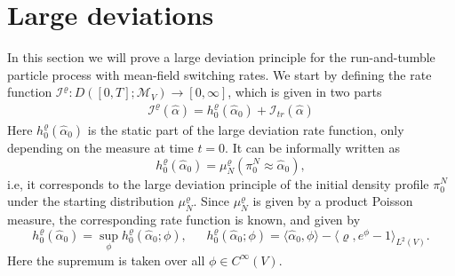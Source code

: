 \documentclass[11pt]{article}
\numberwithin{equation}{section}
\theoremstyle{definition}
\theoremstyle{plain}
\begin{document}
\section{Large deviations}
In this section we will prove a large deviation principle for the run-and-tumble particle process with mean-field switching rates. We start by defining the rate function $\mathcal{I}^{\varrho}: D([0,T];\mathcal{M}_V) \to [0,\infty]$, which is given in two parts
    \begin{align}\label{rate function}
        \mathcal{I}^{\varrho}(\widehat{\alpha}) = h_0^{\varrho}(\widehat{\alpha}_0) + \mathcal{I}_{tr}(\widehat{\alpha})
    \end{align}
Here $h_0^{\varrho}(\widehat{\alpha}_0)$ is the static part of the large deviation rate function, only depending on the measure at time $t=0$. It can be informally written as
    \begin{equation}
        h^\varrho_0(\widehat{\alpha}_0) = \mu^\varrho_N(\pi^N_{0} \approx \widehat{\alpha}_0),
    \end{equation}
i.e, it corresponds to the large deviation principle of the initial density profile $\pi^N_{0}$ under the starting distribution $\mu^\varrho_N$.
Since $\mu_N^{\varrho}$ is given by a product Poisson measure, the corresponding rate function is known, and given by 
    \begin{equation}\label{rateini}
        h_0^{\varrho}(\widehat{\alpha}_0) = \sup_\phi h_0^{\varrho}(\widehat{\alpha}_0;\phi), \ \ \ \ \ \ \ h_0^{\varrho}(\widehat{\alpha}_0;\phi) = \langle \widehat{\alpha}_0,\phi\rangle - \langle \varrho, e^{\phi}-1\rangle_{L^2(V)}.
    \end{equation}
Here the supremum is taken over all $\phi \in C^\infty(V)$.
    
\end{document}

